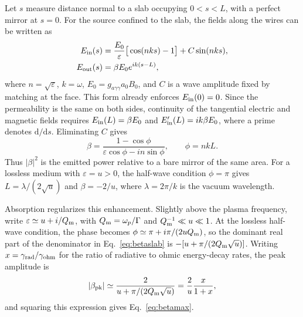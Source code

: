 \documentclass[
  aps,prl,reprint,superscriptaddress,
  amsmath,amssymb,floatfix,nofootinbib
]{revtex4-2}
\newcommand{\gagg}{g_{a\gamma\gamma}}
\newcommand{\Qm}{Q_{\rm m}}
\newcommand{\dd}{\mathrm d}
\begin{document}
Let $s$ measure distance normal to a slab occupying $0<s<L$, with a perfect mirror at $s=0$. For the source confined to the slab, the fields along the wires can be written as
\begin{equation}
\begin{aligned}
E_{\rm in}(s)&=\frac{E_0}{\varepsilon}\big[\cos(nks)-1\big]
                +C\sin(nks),\\
E_{\rm out}(s)&=\beta E_0e^{ik(s-L)},
\end{aligned}
\end{equation}
where $n=\sqrt{\varepsilon}$, $k=\omega$, $E_0=\gagg a_0B_0$, and $C$ is a wave amplitude fixed by matching at the face. This form already enforces $E_{\rm in}(0)=0$. Since the permeability is the same on both sides, continuity of the tangential electric and magnetic fields requires $E_{\rm in}(L)=\beta E_0$ and $E'_{\rm in}(L)=ik\beta E_0$, where a prime denotes $\dd/\dd s$. Eliminating $C$ gives
\begin{equation}
\beta=\frac{1-\cos\phi}{\varepsilon\cos\phi-in\sin\phi},
\qquad \phi=nkL.
\label{eq:betaslab}
\end{equation}
Thus $|\beta|^2$ is the emitted power relative to a bare mirror of the same area. For a lossless medium with $\varepsilon=u>0$, the half-wave condition $\phi=\pi$ gives $L=\lambda/(2\sqrt{u})$ and $\beta=-2/u$, where $\lambda=2\pi/k$ is the vacuum wavelength.

Absorption regularizes this enhancement. Slightly above the plasma frequency, write $\varepsilon\simeq u+i/\Qm$, with $\Qm=\omega_p/\Gamma$ and $\Qm^{-1}\ll u\ll1$. At the lossless half-wave condition, the phase becomes $\phi\simeq\pi+i\pi/(2u\Qm)$, so the dominant real part of the denominator in Eq.~\eqref{eq:betaslab} is $-[u+\pi/(2\Qm\sqrt{u})]$. Writing $x=\gamma_{\rm rad}/\gamma_{\rm ohm}$ for the ratio of radiative to ohmic energy-decay rates, the peak amplitude is
\begin{equation}
|\beta_{\rm pk}|\simeq\frac{2}{u+\pi/(2\Qm\sqrt{u})}
=\frac{2}{u}\frac{x}{1+x},
\label{eq:peakescape}
\end{equation}
and squaring this expression gives Eq.~\eqref{eq:betamax}.
\end{document}
